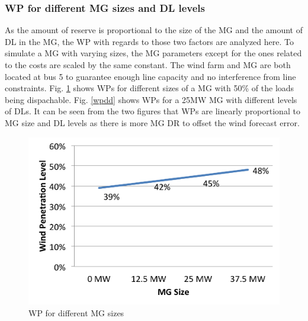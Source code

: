 

\subsubsection{WP for different MG sizes and DL levels}
As the amount of reserve is proportional to the size of the MG and the amount of DL in the MG, the WP with regards to those two factors are analyzed here. To simulate a MG with varying sizes, the MG parameters except for the ones related to the costs are scaled by the same constant. The wind farm and MG are both located at bus 5 to guarantee enough line capacity and no interference from line constraints. Fig. \ref{wpd} shows WPs for different sizes of a MG with 50\% of the loads being dispachable. Fig. \ref{wpdd} shows WPs for a 25MW MG with different levels of DLs. It can be seen from the two figures that WPs are linearly proportional to MG size and DL levels as there is more MG DR to offset the wind forecast error. 

\begin{figure}[H]
\centering
\includegraphics[scale=0.55]{windpd.png}
\caption{WP for different MG sizes}
\label{wpd}
\end{figure}

